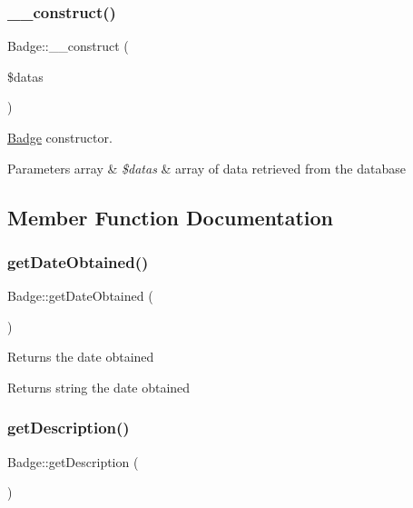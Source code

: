 \subsubsection{\texorpdfstring{\+\_\+\+\_\+construct()}{\_\_construct()}}
{\footnotesize\ttfamily Badge\+::\+\_\+\+\_\+construct (\begin{DoxyParamCaption}\item[{}]{\$datas }\end{DoxyParamCaption})}

\hyperlink{classBadge}{Badge} constructor. 
\begin{DoxyParams}[1]{Parameters}
array & {\em \$datas} & array of data retrieved from the database \\
\hline
\end{DoxyParams}


\subsection{Member Function Documentation}
\mbox{\label{classBadge_a26b32b8cf6d1a7c905526fdb012a7292}} 
\subsubsection{\texorpdfstring{get\+Date\+Obtained()}{getDateObtained()}}
{\footnotesize\ttfamily Badge\+::get\+Date\+Obtained (\begin{DoxyParamCaption}{ }\end{DoxyParamCaption})}

Returns the date obtained \begin{DoxyReturn}{Returns}
string the date obtained 
\end{DoxyReturn}
\mbox{\label{classBadge_adf6b3856f9ced3c4e4d6e97a18168eaf}} 
\subsubsection{\texorpdfstring{get\+Description()}{getDescription()}}
{\footnotesize\ttfamily Badge\+::get\+Description (\begin{DoxyParamCaption}{ }\end{DoxyParamCaption})}


